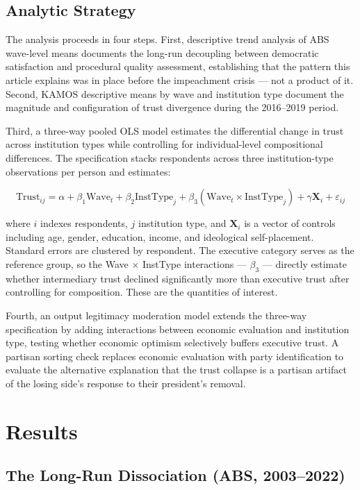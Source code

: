 \documentclass[
  12pt,
  letterpaper]{article}
\begin{document}
\subsection{Analytic Strategy}\label{analytic-strategy}

The analysis proceeds in four steps. First, descriptive trend analysis
of ABS wave-level means documents the long-run decoupling between
democratic satisfaction and procedural quality assessment, establishing
that the pattern this article explains was in place before the
impeachment crisis --- not a product of it. Second, KAMOS descriptive
means by wave and institution type document the magnitude and
configuration of trust divergence during the 2016--2019 period.

Third, a three-way pooled OLS model estimates the differential change in
trust across institution types while controlling for individual-level
compositional differences. The specification stacks respondents across
three institution-type observations per person and estimates:

\[\text{Trust}_{ij} = \alpha + \beta_1 \text{Wave}_t + \beta_2 \text{InstType}_j + \beta_3 (\text{Wave}_t \times \text{InstType}_j) + \gamma \mathbf{X}_i + \varepsilon_{ij}\]

where \(i\) indexes respondents, \(j\) institution type, and
\(\mathbf{X}_i\) is a vector of controls including age, gender,
education, income, and ideological self-placement. Standard errors are
clustered by respondent. The executive category serves as the reference
group, so the Wave × InstType interactions --- \(\beta_3\) --- directly
estimate whether intermediary trust declined significantly more than
executive trust after controlling for composition. These are the
quantities of interest.

Fourth, an output legitimacy moderation model extends the three-way
specification by adding interactions between economic evaluation and
institution type, testing whether economic optimism selectively buffers
executive trust. A partisan sorting check replaces economic evaluation
with party identification to evaluate the alternative explanation that
the trust collapse is a partisan artifact of the losing side's response
to their president's removal.

\section{Results}\label{results}

\subsection{The Long-Run Dissociation (ABS,
2003--2022)}\label{the-long-run-dissociation-abs-20032022}
\end{document}
